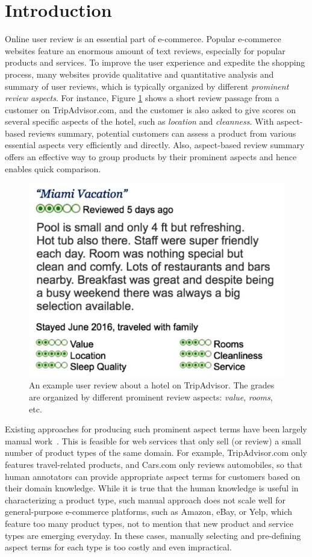 \documentclass[11pt,a4paper]{article}
\newcommand{\figref}[1]{Figure \ref{#1}}
\begin{document}
\section{Introduction}
\label{sec:intro}
Online user review is an essential part of e-commerce. 
Popular e-commerce websites feature an enormous amount of text reviews, 
especially for popular products and services. 
To improve the user experience and expedite the
shopping process, many websites provide qualitative and quantitative
analysis and summary of user reviews, which is typically organized by different 
{\em prominent review aspects}.
For instance, \figref{fig:tripadvisor} shows a short review passage from a customer on TripAdvisor.com, and the customer is also asked
to give scores on several specific aspects of 
the hotel, such as \textit{location} and \textit{cleanness}. 
With aspect-based reviews summary, potential customers can 
assess a product from various essential aspects very efficiently and directly.
Also, aspect-based review summary offers an effective 
way to group products by their prominent aspects and hence
enables quick comparison.
\begin{figure}[th!]
	\centering
	\includegraphics[width=0.7\columnwidth]{figures/tripadvisor}
	\caption{An example user review about a hotel on TripAdvisor. 
		The grades are organized by different prominent review aspects: \textit{value}, \textit{rooms}, etc. }
	\label{fig:tripadvisor}
\end{figure}                                

Existing approaches for producing such prominent aspect terms have been
largely manual work~\cite{poria2014rule,qiu2011opinion}. This is feasible for web services that only 
sell (or review) a small number of  product types of the same domain. 
For example, TripAdvisor.com only features travel-related products, 
and Cars.com only reviews automobiles, so that human annotators can provide 
appropriate aspect terms for customers based on their domain knowledge.  
While it is true that the human knowledge is useful
in characterizing a product type,
such manual approach does not scale well for 
general-purpose e-commerce platforms, such as Amazon, eBay,  
or Yelp, which feature too many product types, 
not to mention that new product and service types are emerging 
everyday.  
In these cases, manually selecting and pre-defining 
aspect terms for each type is too costly and even impractical.
\end{document}
